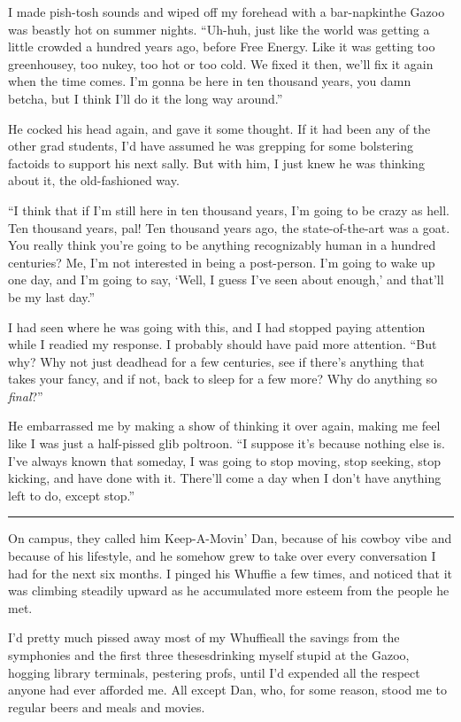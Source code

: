 I made pish-tosh sounds and wiped off my forehead with a
bar-napkin{\dash}the Gazoo was beastly hot on summer nights. “Uh-huh,
just like the world was getting a little crowded a hundred years
ago, before Free Energy. Like it was getting too greenhousey, too
nukey, too hot or too cold. We fixed it then, we'll fix it again
when the time comes. I'm gonna be here in ten thousand years, you
damn betcha, but I think I'll do it the long way around.”

He cocked his head again, and gave it some thought. If it had been
any of the other grad students, I'd have assumed he was grepping
for some bolstering factoids to support his next sally. But with
him, I just knew he was thinking about it, the old-fashioned way.

“I think that if I'm still here in ten thousand years, I'm going to
be crazy as hell. Ten thousand years, pal! Ten thousand years ago,
the state-of-the-art was a goat. You really think you're going to
be anything recognizably human in a hundred centuries? Me, I'm not
interested in being a post-person. I'm going to wake up one day,
and I'm going to say, ‘Well, I guess I've seen about enough,’ and
that'll be my last day.”

I had seen where he was going with this, and I had stopped paying
attention while I readied my response. I probably should have paid
more attention. “But why? Why not just deadhead for a few
centuries, see if there's anything that takes your fancy, and if
not, back to sleep for a few more? Why do anything so
\emph{final}?”

He embarrassed me by making a show of thinking it over again,
making me feel like I was just a half-pissed glib poltroon. “I
suppose it's because nothing else is. I've always known that
someday, I was going to stop moving, stop seeking, stop kicking,
and have done with it. There'll come a day when I don't have
anything left to do, except stop.”

\begin{center}\rule{3in}{0.4pt}\end{center}

On campus, they called him Keep-A-Movin' Dan, because of his cowboy
vibe and because of his lifestyle, and he somehow grew to take over
every conversation I had for the next six months. I pinged his
Whuffie a few times, and noticed that it was climbing steadily
upward as he accumulated more esteem from the people he met.

I'd pretty much pissed away most of my Whuffie{\dash}all the savings from
the symphonies and the first three theses{\dash}drinking myself stupid at
the Gazoo, hogging library terminals, pestering profs, until I'd
expended all the respect anyone had ever afforded me. All except
Dan, who, for some reason, stood me to regular beers and meals and
movies.

